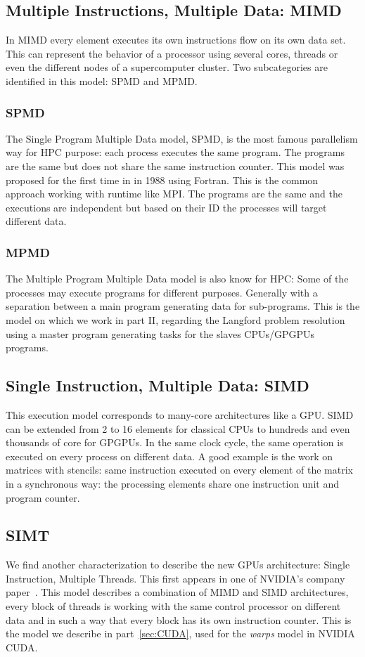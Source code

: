 \subsection{Multiple Instructions, Multiple Data: MIMD}
In MIMD every element executes its own instructions flow on its own data set. 
This can represent the behavior of a processor using several cores, threads or even the different nodes of a supercomputer cluster. 
Two subcategories are identified in this model: SPMD and MPMD.

\subsubsection{SPMD}
The Single Program Multiple Data model, SPMD, is the most famous parallelism way for HPC purpose: each process executes the same program. 
The programs are the same but does not share the same instruction counter. 
This model was proposed for the first time in \cite{darema1988single} in 1988 using Fortran.
This is the common approach working with runtime like MPI. 
The programs are the same and the executions are independent but based on their ID the processes will target different data. 

\subsubsection{MPMD}
The Multiple Program Multiple Data model is also know for HPC: Some of the processes may execute programs for different purposes.  
Generally with a separation between a main program generating data for sub-programs. 
This is the model on which we work in part II, regarding the Langford problem resolution using a master program generating tasks for the slaves CPUs/GPGPUs programs.

\subsection{Single Instruction, Multiple Data: SIMD}
This execution model corresponds to many-core architectures like a GPU. 
SIMD can be extended from 2 to 16 elements for classical CPUs to hundreds and even thousands of core for GPGPUs. 
In the same clock cycle, the same operation is executed on every process on different data. 
A good example is the work on matrices with stencils: same instruction executed on every element of the matrix in a synchronous way: the processing elements share one instruction unit and program counter. 

\subsection{SIMT}
We find another characterization to describe the new GPUs architecture: Single Instruction, Multiple Threads. 
This first appears in one of NVIDIA's company paper~\cite{lindholm2008nvidia}. 
This model describes a combination of MIMD and SIMD architectures, every block of threads is working with the same control processor on different data and in such a way that every block has its own instruction counter.  
This is the model we describe in part~\ref{sec:CUDA}, used for the \textit{warps} model in NVIDIA CUDA.

